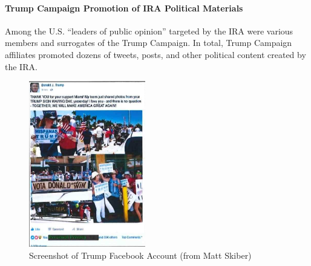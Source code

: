 \paragraph{Trump Campaign Promotion of IRA Political Materials}

Among the U.S. ``leaders of public opinion'' targeted by the IRA were various members and surrogates of the Trump Campaign.
In total, Trump Campaign affiliates promoted dozens of tweets, posts, and other political content created by the IRA\null.

\begin{figure}
    \vspace{-20pt}
    \begin{center}
        \includegraphics[width=2in]{images/p-34-trump-facebook.png}%
    \end{center}
    \vspace{-20pt}
    \caption*{Screenshot of Trump Facebook Account (from Matt Skiber)}
    \vspace{-10pt}
    \label{fig:trump-facebook}
\end{figure}

